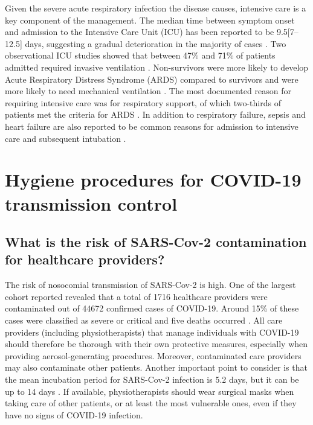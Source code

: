 Given the severe acute respiratory infection the disease causes, intensive care is a key component of the management. The median time between symptom onset and admission to the Intensive Care Unit (ICU) has been reported to be 9.5[7–12.5] days, suggesting a gradual deterioration in the majority of cases \cite{yang_clinical_2020}. Two observational ICU studies showed that between 47\% and 71\% of patients admitted required invasive ventilation \cite{yang_clinical_2020,wang_clinical_2020}. Non-survivors were more likely to develop Acute Respiratory Distress Syndrome (ARDS) compared to survivors and were more likely to need mechanical ventilation \cite{yang_clinical_2020}. The most documented reason for requiring intensive care was for respiratory support, of which two-thirds of patients met the criteria for ARDS \cite{wang_clinical_2020}. In addition to respiratory failure, sepsis and heart failure are also reported to be common reasons for admission to intensive care and subsequent intubation \cite{zhou_clinical_2020,ruan_clinical_2020}.

\section{Hygiene procedures for COVID-19 transmission control}
\subsection{What is the risk of SARS-Cov-2 contamination for healthcare providers?}
The risk of nosocomial transmission of SARS-Cov-2 is high. One of the largest cohort reported revealed that a total of 1716 healthcare providers were contaminated out of 44672 confirmed cases of COVID-19. Around 15\% of these cases were classified as severe or critical and five deaths occurred \cite{wu_characteristics_2020}. All care providers (including physiotherapists) that manage individuals with COVID-19 should therefore be thorough with their own protective measures, especially when providing aerosol-generating procedures. Moreover, contaminated care providers may also contaminate other patients. Another important point to consider is that the mean incubation period for SARS-Cov-2 infection is 5.2 days, but it can be up to 14 days \cite{li_early_2020}. If available, physiotherapists should wear surgical masks when taking care of other patients, or at least the most vulnerable ones, even if they have no signs of COVID-19 infection. 

